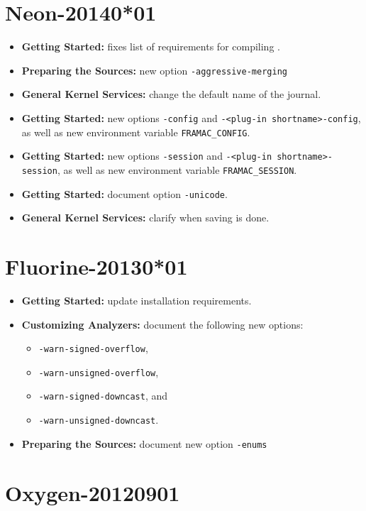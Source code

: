 \section*{Neon-20140*01}
\begin{itemize}
\item \textbf{Getting Started:} fixes list of requirements
  for compiling \FramaC.
\item \textbf{Preparing the Sources:} new option \texttt{-aggressive-merging}
\item \textbf{General Kernel Services:} change the default name of the journal.
\item \textbf{Getting Started:}
  new options \texttt{-config} and \texttt{-<plug-in shortname>-config}, as
  well as new environment variable \texttt{FRAMAC\_CONFIG}.
\item \textbf{Getting Started:}
  new options \texttt{-session} and \texttt{-<plug-in shortname>-session}, as
  well as new environment variable \texttt{FRAMAC\_SESSION}.
\item \textbf{Getting Started:} document option \texttt{-unicode}.
\item \textbf{General Kernel Services:} clarify when saving is done.
\end{itemize}

\section*{Fluorine-20130*01}
\begin{itemize}
\item \textbf{Getting Started:} update installation requirements.
\item \textbf{Customizing Analyzers:} document the following new options:
  \begin{itemize}
  \item \texttt{-warn-signed-overflow},
  \item \texttt{-warn-unsigned-overflow},
  \item \texttt{-warn-signed-downcast}, and
  \item \texttt{-warn-unsigned-downcast}.
  \end{itemize}
\item \textbf{Preparing the Sources:} document new option \texttt{-enums}
\end{itemize}

\section*{Oxygen-20120901}

